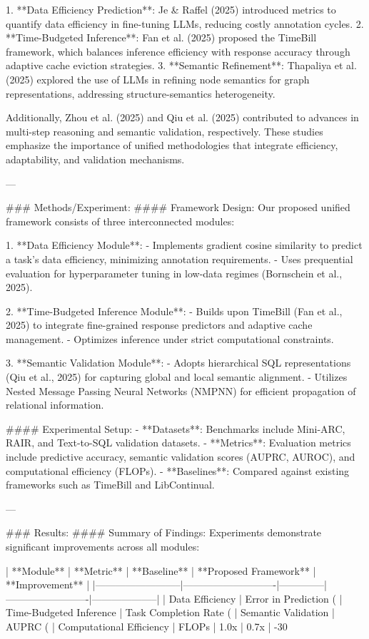 1. **Data Efficiency Prediction**: Je & Raffel (2025) introduced metrics to quantify data efficiency in fine-tuning LLMs, reducing costly annotation cycles.
2. **Time-Budgeted Inference**: Fan et al. (2025) proposed the TimeBill framework, which balances inference efficiency with response accuracy through adaptive cache eviction strategies.
3. **Semantic Refinement**: Thapaliya et al. (2025) explored the use of LLMs in refining node semantics for graph representations, addressing structure-semantics heterogeneity.

Additionally, Zhou et al. (2025) and Qiu et al. (2025) contributed to advances in multi-step reasoning and semantic validation, respectively. These studies emphasize the importance of unified methodologies that integrate efficiency, adaptability, and validation mechanisms.

---

### Methods/Experiment:
#### Framework Design:
Our proposed unified framework consists of three interconnected modules:

1. **Data Efficiency Module**:
   - Implements gradient cosine similarity to predict a task’s data efficiency, minimizing annotation requirements.
   - Uses prequential evaluation for hyperparameter tuning in low-data regimes (Bornschein et al., 2025).

2. **Time-Budgeted Inference Module**:
   - Builds upon TimeBill (Fan et al., 2025) to integrate fine-grained response predictors and adaptive cache management.
   - Optimizes inference under strict computational constraints.

3. **Semantic Validation Module**:
   - Adopts hierarchical SQL representations (Qiu et al., 2025) for capturing global and local semantic alignment.
   - Utilizes Nested Message Passing Neural Networks (NMPNN) for efficient propagation of relational information.

#### Experimental Setup:
- **Datasets**: Benchmarks include Mini-ARC, RAIR, and Text-to-SQL validation datasets.
- **Metrics**: Evaluation metrics include predictive accuracy, semantic validation scores (AUPRC, AUROC), and computational efficiency (FLOPs).
- **Baselines**: Compared against existing frameworks such as TimeBill and LibContinual.

---

### Results:
#### Summary of Findings:
Experiments demonstrate significant improvements across all modules:

| **Module**              | **Metric**                 | **Baseline** | **Proposed Framework** | **Improvement**    |
|--------------------------|----------------------------|--------------|-------------------------|--------------------|
| Data Efficiency          | Error in Prediction (%
| Time-Budgeted Inference  | Task Completion Rate (%
| Semantic Validation      | AUPRC (%
| Computational Efficiency | FLOPs                     | 1.0x         | 0.7x                    | -30%

